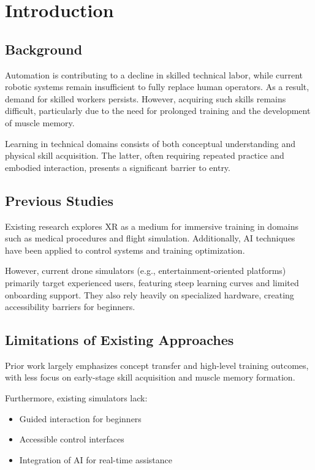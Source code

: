 \section{Introduction}

\subsection{Background}
Automation is contributing to a decline in skilled technical labor, while current robotic systems remain insufficient to fully replace human operators. As a result, demand for skilled workers persists. However, acquiring such skills remains difficult, particularly due to the need for prolonged training and the development of muscle memory.

Learning in technical domains consists of both conceptual understanding and physical skill acquisition. The latter, often requiring repeated practice and embodied interaction, presents a significant barrier to entry.

\subsection{Previous Studies}
Existing research explores XR as a medium for immersive training in domains such as medical procedures and flight simulation. Additionally, AI techniques have been applied to control systems and training optimization.

However, current drone simulators (e.g., entertainment-oriented platforms) primarily target experienced users, featuring steep learning curves and limited onboarding support. They also rely heavily on specialized hardware, creating accessibility barriers for beginners.

\subsection{Limitations of Existing Approaches}
Prior work largely emphasizes concept transfer and high-level training outcomes, with less focus on early-stage skill acquisition and muscle memory formation.

Furthermore, existing simulators lack:
\begin{itemize}
    \item Guided interaction for beginners
    \item Accessible control interfaces
    \item Integration of AI for real-time assistance
\end{itemize}

